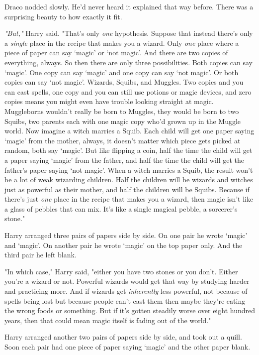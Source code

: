 Draco nodded slowly. He'd never heard it explained that way before. There was a
surprising beauty to how exactly it fit.

\emph{"But,"} Harry said. "That's only \emph{one} hypothesis. Suppose that
instead there's only a \emph{single} place in the recipe that makes you a
wizard. Only \emph{one} place where a piece of paper can say `magic' or `not
magic'. And there are two copies of everything, always. So then there are only
three possibilities. Both copies can say `magic'. One copy can say `magic' and
one copy can say `not magic'. Or both copies can say `not magic'. Wizards,
Squibs, and Muggles. Two copies and you can cast spells, one copy and you can
still use potions or magic devices, and zero copies means you might even have
trouble looking straight at magic. Muggleborns wouldn't really be born to
Muggles, they would be born to two Squibs, two parents each with one magic copy
who'd grown up in the Muggle world. Now imagine a witch marries a Squib. Each
child will get one paper saying `magic' from the mother, always, it doesn't
matter which piece gets picked at random, both say `magic'. But like flipping a
coin, half the time the child will get a paper saying `magic' from the father,
and half the time the child will get the father's paper saying `not magic'.
When a witch marries a Squib, the result won't be a lot of weak wizarding
children. Half the children will be wizards and witches just as powerful as
their mother, and half the children will be Squibs. Because if there's just
\emph{one} place in the recipe that makes you a wizard, then magic isn't like a
glass of pebbles that can mix. It's like a single magical pebble, a sorcerer's
stone."

Harry arranged three pairs of papers side by side. On one pair he wrote `magic'
and `magic'. On another pair he wrote `magic' on the top paper only. And the
third pair he left blank.

"In which case," Harry said, "either you have two stones or you don't. Either
you're a wizard or not. Powerful wizards would get that way by studying harder
and practicing more. And if wizards get \emph{inherently} less powerful, not
because of spells being lost but because people can't cast them{\el} then
maybe they're eating the wrong foods or something. But if it's gotten steadily
worse over eight hundred years, then that could mean magic itself is fading out
of the world."

Harry arranged another two pairs of papers side by side, and took out a quill.
Soon each pair had one piece of paper saying `magic' and the other paper blank.


